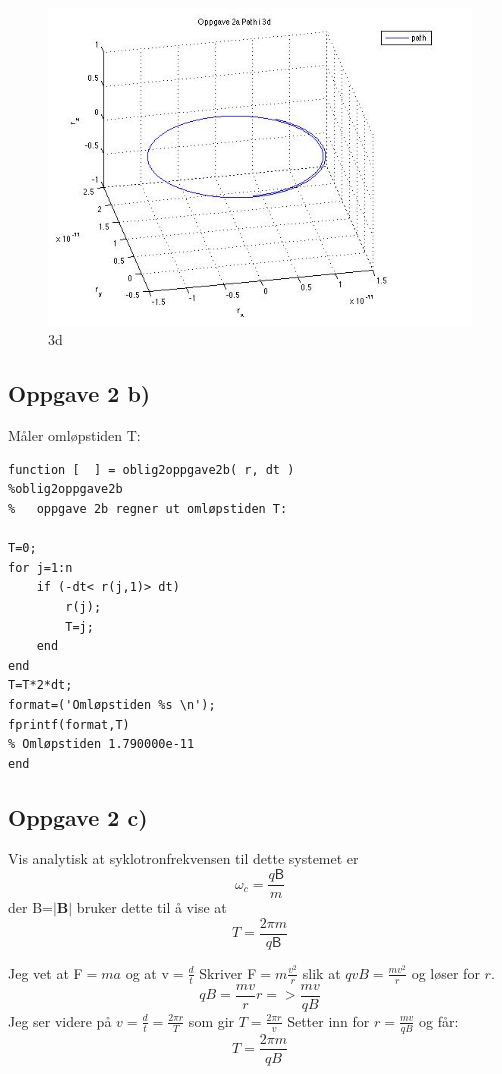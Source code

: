 \documentclass[12pt,a4paper,final,leqno]{report}
\begin{document}
\begin{figure}[H]
\caption{3d}
\centering
\includegraphics[width=\textwidth]{oppgave23d.jpg}
\end{figure}
\subsection*{Oppgave 2 b)}
Måler omløpstiden T:
\begin{verbatim}
function [  ] = oblig2oppgave2b( r, dt )
%oblig2oppgave2b 
%   oppgave 2b regner ut omløpstiden T:

T=0;
for j=1:n
    if (-dt< r(j,1)> dt)
        r(j);
        T=j;
    end    
end
T=T*2*dt;
format=('Omløpstiden %s \n');
fprintf(format,T)
% Omløpstiden 1.790000e-11 
end
\end{verbatim}
\subsection*{Oppgave 2 c)}
 Vis analytisk at syklotronfrekvensen til dette systemet er
 $$
 \omega_c=\frac{q\mathsf{B}}{m}
 $$
 der B=$|\mathbf{B}|$ bruker dette til å vise at
 $$
T=\frac{2\pi m}{q\mathsf{B}}
$$

Jeg vet at F$=ma$ og at v$=\frac{d}{t}$
Skriver F$=m\frac{v^2}{r}$ slik at $qvB=\frac{mv^2}{r}$ og løser for $r$.
$$
qB=\frac{mv}{r}r=>\frac{mv}{qB}
$$
Jeg ser videre på $v=\frac{d}{t}=\frac{2\pi r}{T}$ som gir $T=\frac{2\pi r}{v}$
Setter inn for $r=\frac{mv}{qB} $ og får:
$$
T=\frac{2\pi m}{qB}
$$
\end{document}
